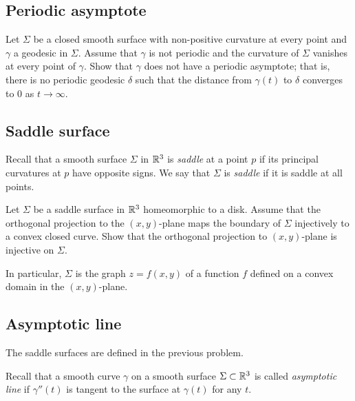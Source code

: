 \subsection*{Periodic asymptote}
\label{Asymptotic geodesic}

\begin{pr}
Let $\Sigma$ be a closed smooth surface with non-positive curvature at every point
and $\gamma$ a geodesic in $\Sigma$.
Assume that $\gamma$ is not periodic
and the curvature of $\Sigma$ vanishes at every point of $\gamma$.
Show that $\gamma$ does not have a periodic asymptote;
that is, there is no periodic geodesic $\delta$ such that the distance from $\gamma(t)$ to $\delta$  converges to $0$ as $t\to\infty$. 
\end{pr}

\subsection*{Saddle surface}
\label{Saddle surface}

Recall that a smooth surface $\Sigma$ in $\mathbb{R}^3$
is \emph{saddle} at a point $p$ if its principal curvatures at $p$ have opposite signs. 
We say that $\Sigma$ is {}\emph{saddle} if it is saddle at all points.

\begin{pr}
Let $\Sigma$ be a saddle surface in $\mathbb{R}^3$
homeomorphic to a disk.
Assume that the orthogonal projection to the $(x,y)$-plane
maps the boundary of $\Sigma$
injectively to a convex closed curve.
Show that the orthogonal projection to $(x,y)$-plane is injective on $\Sigma$.

In particular, $\Sigma$ is the graph $z=f(x,y)$ of a function $f$ defined on a convex domain in the $(x,y)$-plane.
\end{pr}


\subsection*{Asymptotic line}
\label{asymptotic-line}

The saddle surfaces are defined in the previous problem.

Recall that a smooth curve $\gamma$ on a smooth surface $\Sigma\subset \mathbb{R}^3$ is called \emph{asymptotic line} if $\gamma''(t)$ is tangent to the surface at $\gamma(t)$ for any $t$.

